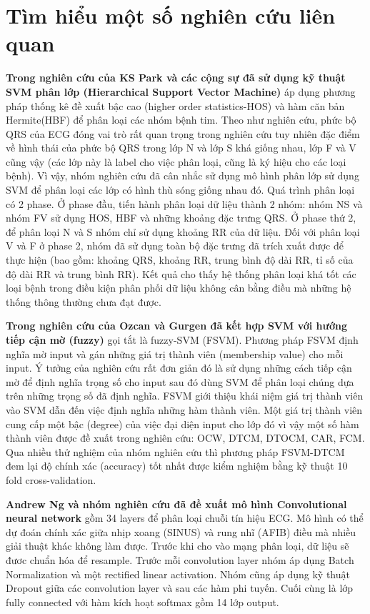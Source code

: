 \chapter{Tìm hiểu một số nghiên cứu liên quan}
\thispagestyle{fancy}
\textbf{Trong nghiên cứu của KS Park và các cộng sự đã sử dụng kỹ thuật SVM phân lớp (Hierarchical Support Vector Machine)} áp dụng phương pháp thống kê đề xuất bậc cao (higher order statistics-HOS) và hàm căn bản Hermite(HBF) để phân loại các nhóm bệnh tim. Theo như nghiên cứu, phức bộ QRS của ECG đóng vai trò rất quan trọng trong nghiên cứu tuy nhiên đặc điểm về hình thái của phức bộ QRS trong lớp N và lớp S khá giống nhau, lớp F và V cũng vậy (các lớp này là label cho việc phân loại, cũng là ký hiệu cho các loại bệnh). Vì vậy, nhóm nghiên cứu đã cân nhắc sử dụng mô hình phân lớp sử dụng SVM để phân loại các lớp có hình thù sóng giống nhau đó. Quá trình phân loại có 2 phase. Ở phase đầu, tiến hành phân loại dữ liệu thành 2 nhóm: nhóm NS và nhóm FV sử dụng HOS,  HBF và những khoảng đặc trưng QRS. Ở phase thứ 2, để phân loại N và S nhóm chỉ sử dụng khoảng RR của dữ liệu. Đối với phân loại V và F ở phase 2, nhóm đã sử dụng toàn bộ đặc trưng đã trích xuất được để thực hiện (bao gồm: khoảng QRS, khoảng RR, trung bình độ dài RR, tỉ số của độ dài RR và trung bình RR). Kết quả cho thấy hệ thống phân loại khá tốt các loại bệnh trong điều kiện phân phối dữ liệu không cân bằng điều mà những hệ thống thông thường chưa đạt được.\par

\textbf{Trong nghiên cứu của Ozcan và Gurgen đã kết hợp SVM với hướng tiếp cận mờ (fuzzy)} gọi tắt là fuzzy-SVM (FSVM). Phương pháp FSVM định nghĩa mờ input và gán những giá trị thành viên (membership value) cho mỗi input. Ý tưởng của nghiên cứu rất đơn giản đó là sử dụng những cách tiếp cận mờ để định nghĩa trọng số cho input sau đó dùng SVM để phân loại chúng dựa trên những trọng số đã định nghĩa. FSVM giới thiệu khái niệm giá trị thành viên vào SVM dẫn đến việc định nghĩa những hàm thành viên. Một giá trị thành viên cung cấp một bậc (degree) của việc đại diện input cho lớp đó vì vậy một số hàm thành viên được đề xuất trong nghiên cứu: OCW, DTCM, DTOCM, CAR, FCM. Qua nhiều thử nghiệm của nhóm nghiên cứu thì phương pháp FSVM-DTCM đem lại độ chính xác (accuracy) tốt nhất được kiểm nghiệm bằng kỹ thuật 10 fold cross-validation.\par

\textbf{Andrew Ng và nhóm nghiên cứu đã đề xuất mô hình Convolutional neural network} gồm 34 layers để phân loại chuỗi tín hiệu ECG. Mô hình có thể dự đoán chính xác giữa nhịp xoang (SINUS) và rung nhĩ (AFIB) điều mà nhiều giải thuật khác không làm được. Trước khi cho vào mạng phân loại, dữ liệu sẽ đươc chuẩn hóa để resample. Trước mỗi convolution layer nhóm áp dụng Batch Normalization và một rectified linear activation. Nhóm cũng áp dụng kỹ thuật Dropout giữa các convolution layer và sau các hàm phi tuyến. Cuối cùng là lớp fully connected với hàm kích hoạt softmax gồm 14 lớp output.\par 

